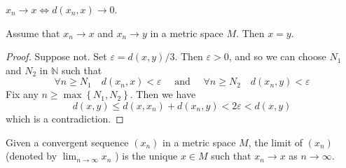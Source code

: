 \documentclass[a4paper]{article}
\begin{document}
\begin{note}
    $x_{n} \rightarrow x \Longleftrightarrow d\left(x_{n}, x\right) \rightarrow 0$.
\end{note}
\begin{lemma}\label{lma:1}
    Assume that $x_{n} \rightarrow x$ and $x_{n} \rightarrow y$ in a metric space $M$. Then $x=y$.
\end{lemma}

\begin{proof}
    Suppose not. Set $\varepsilon=d(x, y) / 3 .$ Then $\varepsilon>0$, and so we can choose $N_{1}$ and $N_{2}$ in $\mathbb{N}$ such that
    \[
    \forall n \geqslant N_{1} \quad d\left(x_{n}, x\right)<\varepsilon \quad \text { and } \quad \forall n \geqslant N_{2} \quad d\left(x_{n}, y\right)<\varepsilon
    \]
    Fix any $n \geqslant \max \left\{N_{1}, N_{2}\right\} .$ Then we have
    \[
    d(x, y) \leqslant d\left(x, x_{n}\right)+d\left(x_{n}, y\right)<2 \varepsilon<d(x, y)
    \]
    which is a contradiction.
\end{proof}

\begin{definition}
    Given a convergent sequence $\left(x_{n}\right)$ in a metric space $M$, the limit of $\left(x_{n}\right)$ (denoted by $\lim _{n \rightarrow \infty} x_{n}$ ) is the unique $x \in M$ such that $x_{n} \rightarrow x$ as $n \rightarrow \infty$.
\end{definition}
\end{document}

